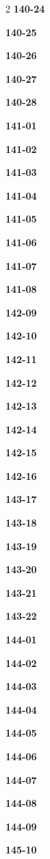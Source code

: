 \documentclass[10pt,a4paper]{article}
\begin{document}
\begin{multicols}{2}
\noindent\textbf{140-24}\ \par
\noindent\textbf{140-25}\ \par
\noindent\textbf{140-26}\ \par
\noindent\textbf{140-27}\ \par
\noindent\textbf{140-28}\ \par
\noindent\textbf{141-01}\ \par
\noindent\textbf{141-02}\ \par
\noindent\textbf{141-03}\ \par
\noindent\textbf{141-04}\ \par
\noindent\textbf{141-05}\ \par
\noindent\textbf{141-06}\ \par
\noindent\textbf{141-07}\ \par
\noindent\textbf{141-08}\ \par
\noindent\textbf{142-09}\ \par
\noindent\textbf{142-10}\ \par
\noindent\textbf{142-11}\ \par
\noindent\textbf{142-12}\ \par
\noindent\textbf{142-13}\ \par
\noindent\textbf{142-14}\ \par
\noindent\textbf{142-15}\ \par
\noindent\textbf{142-16}\ \par
\noindent\textbf{143-17}\ \par
\noindent\textbf{143-18}\ \par
\noindent\textbf{143-19}\ \par
\noindent\textbf{143-20}\ \par
\noindent\textbf{143-21}\ \par
\noindent\textbf{143-22}\ \par
\noindent\textbf{144-01}\ \par
\noindent\textbf{144-02}\ \par
\noindent\textbf{144-03}\ \par
\noindent\textbf{144-04}\ \par
\noindent\textbf{144-05}\ \par
\noindent\textbf{144-06}\ \par
\noindent\textbf{144-07}\ \par
\noindent\textbf{144-08}\ \par
\noindent\textbf{144-09}\ \par
\noindent\textbf{145-10}\ \par

\end{multicols}
\end{document}

